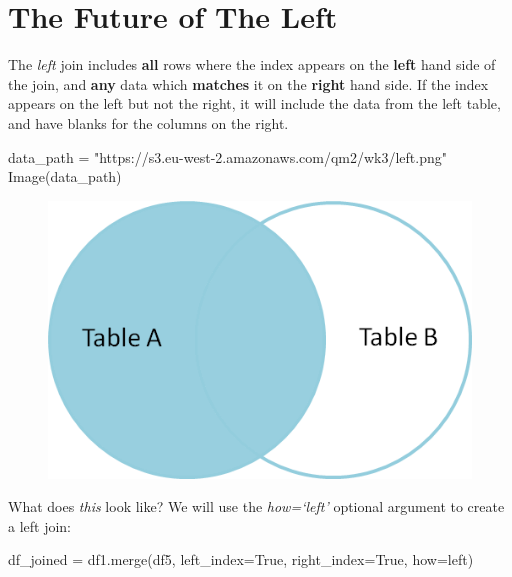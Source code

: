 \documentclass[
  letterpaper,
  DIV=11,
  numbers=noendperiod]{scrreprt}
\newenvironment{Shaded}{\begin{snugshade}}{\end{snugshade}}
\newcommand{\NormalTok}[1]{\textcolor[rgb]{0.00,0.23,0.31}{#1}}
\newcommand{\OperatorTok}[1]{\textcolor[rgb]{0.37,0.37,0.37}{#1}}
\newcommand{\StringTok}[1]{\textcolor[rgb]{0.13,0.47,0.30}{#1}}
\newcommand{\VariableTok}[1]{\textcolor[rgb]{0.07,0.07,0.07}{#1}}
\begin{document}
\hypertarget{the-future-of-the-left}{%
\section{The Future of The Left}\label{the-future-of-the-left}}

The \emph{left} join includes \textbf{all} rows where the index appears
on the \textbf{left} hand side of the join, and \textbf{any} data which
\textbf{matches} it on the \textbf{right} hand side. If the index
appears on the left but not the right, it will include the data from the
left table, and have blanks for the columns on the right.

\begin{Shaded}
\begin{Highlighting}[]
\NormalTok{data\_path }\OperatorTok{=} \StringTok{"https://s3.eu{-}west{-}2.amazonaws.com/qm2/wk3/left.png"}
\NormalTok{Image(data\_path)}
\end{Highlighting}
\end{Shaded}

\begin{figure}[H]

{\centering \includegraphics{notebooks/W05. Merging and Joining_files/figure-pdf/cell-38-output-1.png}

}

\end{figure}

What does \emph{this} look like? We will use the \emph{how=`left'}
optional argument to create a left join:

\begin{Shaded}
\begin{Highlighting}[]
\NormalTok{df\_joined }\OperatorTok{=}\NormalTok{ df1.merge(df5, left\_index}\OperatorTok{=}\VariableTok{True}\NormalTok{, right\_index}\OperatorTok{=}\VariableTok{True}\NormalTok{, how}\OperatorTok{=}\StringTok{\textquotesingle{}left\textquotesingle{}}\NormalTok{)}
\end{Highlighting}
\end{Shaded}
\end{document}
